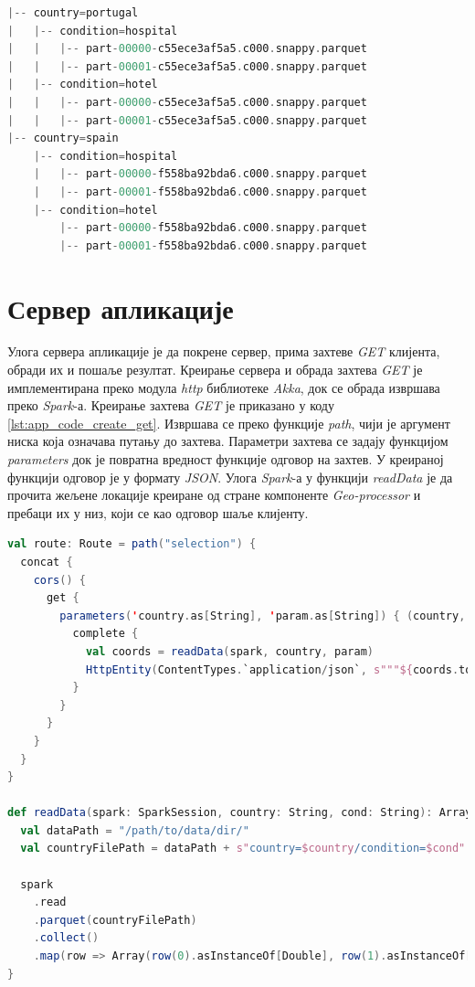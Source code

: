 \documentclass[12pt,oneside]{memoir}
\begin{document}
\begin{lstlisting}[caption={Структура директоријума партиционисаног по државама и врстама локација}, language=Scala, label={lst:app_code_partition_by_countries}]
|-- country=portugal
|   |-- condition=hospital
|   |   |-- part-00000-c55ece3af5a5.c000.snappy.parquet
|   |   |-- part-00001-c55ece3af5a5.c000.snappy.parquet
|   |-- condition=hotel
|   |   |-- part-00000-c55ece3af5a5.c000.snappy.parquet
|   |   |-- part-00001-c55ece3af5a5.c000.snappy.parquet
|-- country=spain
    |-- condition=hospital
    |   |-- part-00000-f558ba92bda6.c000.snappy.parquet
    |   |-- part-00001-f558ba92bda6.c000.snappy.parquet
    |-- condition=hotel
        |-- part-00000-f558ba92bda6.c000.snappy.parquet
        |-- part-00001-f558ba92bda6.c000.snappy.parquet
\end{lstlisting}

\section{Сервер апликације}
\label{sec:app_server}

Улога сервера апликације је да покрене сервер, прима захтеве \textit{GET} клијента, обради их и пошаље резултат. Креирање сервера и обрада захтева \textit{GET} је имплементирана преко модула \textit{http} библиотеке \textit{Akka}, док се обрада извршава преко \textit{Spark}-а. Креирање захтева \textit{GET} је приказано у коду \ref{lst:app_code_create_get}. Извршава се преко функције \textit{path}, чији је аргумент ниска која означава путању до захтева. Параметри захтева се задају функцијом \textit{parameters} док је повратна вредност функције одговор на захтев. У креираној функцији одговор је у формату \textit{JSON}. Улога \textit{Spark}-а у функцији \textit{readData} је да прочита жељене локације креиране од стране компоненте \textit{Geo-processor} и пребаци их у низ, који се као одговор шаље клијенту.

\begin{lstlisting}[caption={Имплементација функције која прима и обрађује захтев \textit{GET}}, language=Scala, label={lst:app_code_create_get}]
val route: Route = path("selection") {
  concat {
    cors() {
      get {
        parameters('country.as[String], 'param.as[String]) { (country, param) =>
          complete {
            val coords = readData(spark, country, param)
            HttpEntity(ContentTypes.`application/json`, s"""${coords.toJson}""")
          }
        }
      }
    }
  }
}

def readData(spark: SparkSession, country: String, cond: String): Array[Array[Double]] = {
  val dataPath = "/path/to/data/dir/"
  val countryFilePath = dataPath + s"country=$country/condition=$cond"

  spark
    .read
    .parquet(countryFilePath)
    .collect()
    .map(row => Array(row(0).asInstanceOf[Double], row(1).asInstanceOf[Double]))
}
\end{lstlisting}
\end{document}

